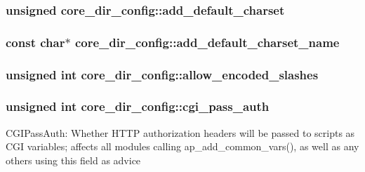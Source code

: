 \subsubsection[{\texorpdfstring{add\+\_\+default\+\_\+charset}{add_default_charset}}]{\setlength{\rightskip}{0pt plus 5cm}unsigned core\+\_\+dir\+\_\+config\+::add\+\_\+default\+\_\+charset}\hypertarget{structcore__dir__config_a180dfc7ebc169bcae56cfbea38589738}{}\label{structcore__dir__config_a180dfc7ebc169bcae56cfbea38589738}
\subsubsection[{\texorpdfstring{add\+\_\+default\+\_\+charset\+\_\+name}{add_default_charset_name}}]{\setlength{\rightskip}{0pt plus 5cm}const char$\ast$ core\+\_\+dir\+\_\+config\+::add\+\_\+default\+\_\+charset\+\_\+name}\hypertarget{structcore__dir__config_a54b05b39cc4e102bb541b20a90bdc559}{}\label{structcore__dir__config_a54b05b39cc4e102bb541b20a90bdc559}
\subsubsection[{\texorpdfstring{allow\+\_\+encoded\+\_\+slashes}{allow_encoded_slashes}}]{\setlength{\rightskip}{0pt plus 5cm}unsigned {\bf int} core\+\_\+dir\+\_\+config\+::allow\+\_\+encoded\+\_\+slashes}\hypertarget{structcore__dir__config_aea246f1072ed8a770cefdac75afab0ae}{}\label{structcore__dir__config_aea246f1072ed8a770cefdac75afab0ae}
\subsubsection[{\texorpdfstring{cgi\+\_\+pass\+\_\+auth}{cgi_pass_auth}}]{\setlength{\rightskip}{0pt plus 5cm}unsigned {\bf int} core\+\_\+dir\+\_\+config\+::cgi\+\_\+pass\+\_\+auth}\hypertarget{structcore__dir__config_aef534deb0cc47b1ee8a030a5a3a07a6a}{}\label{structcore__dir__config_aef534deb0cc47b1ee8a030a5a3a07a6a}
C\+G\+I\+Pass\+Auth\+: Whether H\+T\+TP authorization headers will be passed to scripts as C\+GI variables; affects all modules calling ap\+\_\+add\+\_\+common\+\_\+vars(), as well as any others using this field as advice 
